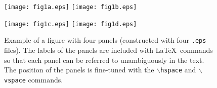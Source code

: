 \documentclass[namedreferences]{solarphysics}
\begin{document}
\begin{article}
{  \begin{figure}    %
   \centerline{\hspace*{0.015\textwidth}
               \texttt{[image: fig1a.eps]}
               \hspace*{-0.03\textwidth}
               \texttt{[image: fig1b.eps]}
              }
     \vspace{-0.35\textwidth}   %
     \centerline{\Large \bf     %
      \hspace{0.0 \textwidth}  \color{white}{(a)}
      \hspace{0.415\textwidth}  \color{white}{(b)}
         \hfill}
     \vspace{0.31\textwidth}    %
%           
   \centerline{\hspace*{0.015\textwidth}
               \texttt{[image: fig1c.eps]}
               \hspace*{-0.03\textwidth}
               \texttt{[image: fig1d.eps]}
              }
     \vspace{-0.35\textwidth}   %
     \centerline{\Large \bf     %
      \hspace{0.0 \textwidth} \color{white}{(c)}
      \hspace{0.415\textwidth}  \color{white}{(d)}
         \hfill}
     \vspace{0.31\textwidth}    %
              
\caption{Example of a figure with four panels (constructed with 
four \texttt{.eps} files).  
The labels of the panels are included with \LaTeX\ commands 
so that each panel can be referred to unambiguously in the text.
The position of the panels
is fine-tuned with the \texttt{$\backslash$hspace} and 
\texttt{$\backslash$vspace} commands.
        }
   \label{F-4panels}
   \end{figure}

}
\end{article}
\end{document}
